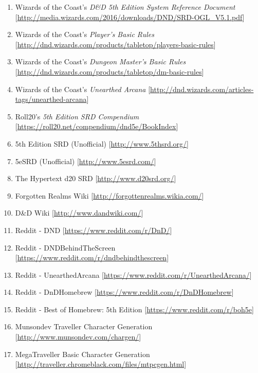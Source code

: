 \documentclass[10pt,twoside]{article}
\begin{document}
\begin{multicols}{2}

\begin{enumerate}

\item Wizards of the Coast's \textit{D\&D 5th Edition System Reference Document} [\url{http://media.wizards.com/2016/downloads/DND/SRD-OGL_V5.1.pdf}]

\item Wizards of the Coast's \textit{Player's Basic Rules} [\url{http://dnd.wizards.com/products/tabletop/players-basic-rules}]

\item Wizards of the Coast's \textit{Dungeon Master's Basic Rules} [\url{http://dnd.wizards.com/products/tabletop/dm-basic-rules}]

\item Wizards of the Coast's \textit{Unearthed Arcana} [\url{http://dnd.wizards.com/articles-tags/unearthed-arcana}]

\item Roll20's \textit{5th Edition SRD Compendium} [\url{https://roll20.net/compendium/dnd5e/BookIndex}]

\item 5th Edition SRD (Unofficial) [\url{http://www.5thsrd.org/}]

\item 5eSRD (Unofficial) [\url{http://www.5esrd.com/}]

\item The Hypertext d20 SRD [\url{http://www.d20srd.org/}]

\item Forgotten Realms Wiki [\url{http://forgottenrealms.wikia.com/}]

\item D\&D Wiki [\url{http://www.dandwiki.com/}]

\item Reddit - DND [\url{https://www.reddit.com/r/DnD/}]

\item Reddit - DNDBehindTheScreen [\url{https://www.reddit.com/r/dndbehindthescreen}]

\item Reddit - UnearthedArcana [\url{https://www.reddit.com/r/UnearthedArcana/}]

\item Reddit - DnDHomebrew [\url{https://www.reddit.com/r/DnDHomebrew}]

\item Reddit - Best of Homebrew: 5th Edition [\url{https://www.reddit.com/r/boh5e}]

\item Munsondev Traveller Character Generation [\url{http://www.munsondev.com/chargen/}]

\item MegaTraveller Basic Character Generation [\url{http://traveller.chromeblack.com/files/mtpcgen.html}]


\end{enumerate}

\end{multicols}

\end{document}

